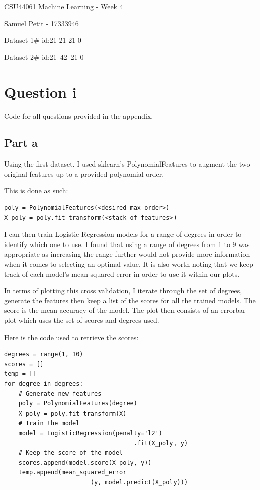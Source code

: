 \documentclass[10pt]{article}
\begin{document}
{\centering
    CSU44061 Machine Learning - Week 4
    \par
    Samuel Petit - 17333946
    \par
    Dataset 1\# id:21-21-21-0 
    \par
    Dataset 2\# id:21--42--21-0  
    \par
}
\section*{Question i}
Code for all questions provided in the appendix.

\subsection*{Part a}
Using the first dataset. I used sklearn's PolynomialFeatures
to augment the two original features up to a provided polynomial order.

This is done as such:
\begin{lstlisting}
poly = PolynomialFeatures(<desired max order>)
X_poly = poly.fit_transform(<stack of features>)
\end{lstlisting}

I can then train Logistic Regression models for a range of
degrees in order to identify which one to use. I found that using a
range of degrees from 1 to 9 was appropriate as increasing the range further
would not provide more information when it comes to selecting an optimal value.
It is also worth noting that we keep track of each model's mean squared error
in order to use it within our plots. 

In terms of plotting this cross validation, I iterate through the set
of degrees, generate the features then keep a list of the scores for all
the trained models. The score is the mean accuracy of the model. The plot
then consists of an errorbar plot which uses the set of scores and degrees used.


Here is the code used to retrieve the scores:
\begin{lstlisting}
degrees = range(1, 10)
scores = []
temp = []
for degree in degrees:
    # Generate new features
    poly = PolynomialFeatures(degree)
    X_poly = poly.fit_transform(X)
    # Train the model
    model = LogisticRegression(penalty='l2')
                                    .fit(X_poly, y)
    # Keep the score of the model
    scores.append(model.score(X_poly, y))
    temp.append(mean_squared_error
                        (y, model.predict(X_poly)))
\end{lstlisting}
\end{document}
